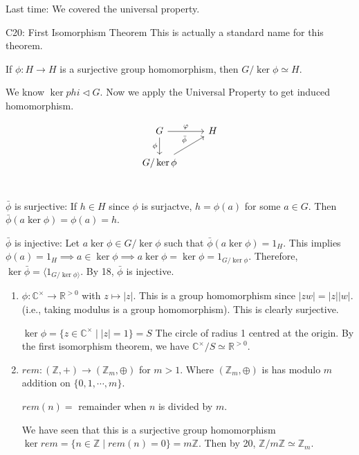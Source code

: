 \documentclass{article}
\newcommand{\rem}{rem}
\begin{document}
Last time: We covered the universal property.

\begin{ccor}{C20: First Isomorphism Theorem}{}
    This is actually a standard name for this theorem. 

    If $ \phi : H \to H$ is a surjective group homomorphism, then $G/\ker{\phi} \simeq H$. 

    \begin{cpf}
        We know $\ker{phi} \triangleleft G$. Now we apply the Universal Property to get induced homomorphism. 


\[ \begin{tikzcd}
        G \arrow{r}{\varphi} \arrow[swap]{d}{\phi} & H \\
        G/\ker{\phi} \arrow{ur}{\bar{\phi}}\\
\end{tikzcd}
\]

        $\bar{\phi}$ is surjective: If $h \in H$ since $\phi$ is surjactve, $h = \phi(a)$ for some $a \in G$. Then $\bar{\phi}(a \ker{\phi}) = \phi(a) = h$. 

        $\bar{\phi}$ is injective: Let $a \ker{\phi} \in G/\ker{\phi}$ such that $\bar{\phi}(a \ker{\phi}) = 1_H$. This implies $\phi(a) = 1_H \implies a \in \ker{\phi} \implies a\ker{\phi} = \ker{\phi} = 1_{G/\ker{\phi}}$. Therefore, $\ker{\bar{\phi}} = \langle 1_{G/\ker{\phi} \rangle}$. By 18, $\bar{\phi}$ is injective. 
    \end{cpf}
\end{ccor}

\begin{cex}{}{}
    \begin{enumerate}
        \item $\phi : \mathbb{C}^\times \to \mathbb{R}^{> 0}$ with $z \mapsto |z|$. This is a group homomorphism since $|zw| = |z||w|$. (i.e., taking modulus is a group homomorphism). This is clearly surjective. 

            $\ker{\phi} = \{ z \in \mathbb{C}^\times \mid |z| = 1 \} = S$ The circle of radius 1 centred at the origin. By the first isomorphism theorem, we have $\mathbb{C}^\times / S \simeq \mathbb{R}^{> 0}$. 

        \item $ \rem : \left( \mathbb{Z}, + \right) \to \left( \mathbb{Z}_{m}, \oplus \right)$ for $m>1$. Where $\left( \mathbb{Z}_{m}, \oplus \right)$ is has modulo $m$ addition on $ \{ 0, 1, \cdots, m \}$. 

            $\rem(n) = $ remainder when $n$ is divided by $m$. 

            We have seen that this is a surjective group homomorphism $\ker{\rem} = \{ n \in \mathbb{Z} \mid \rem(n) = 0 \} = m\mathbb{Z}$. Then by 20, $\mathbb{Z} / m\mathbb{Z} \simeq \mathbb{Z}_{m}$.  
    \end{enumerate}
\end{cex}
\end{document}
